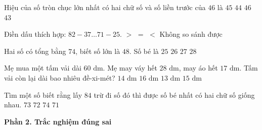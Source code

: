 \begin{ex} %
Hiệu của số tròn chục lớn nhất có hai chữ số và số liền trước của $46$ là
\choice
{\True $45$}
{$44$}
{$46$}
{$43$}
\end{ex}

\begin{ex} %
Điền dấu thích hợp: $82 - 37 \dots 71 - 25$.
\choice
{$>$}
{$=$}
{\True $<$}
{Không so sánh được}
\end{ex}

\begin{ex} %
Hai số có tổng bằng $74$, biết số lớn là $48$. Số bé là
\choice
{$25$}
{\True $26$}
{$27$}
{$28$}
\end{ex}

\begin{ex} %
Mẹ mua một tấm vải dài $60\text{ dm}$. Mẹ may váy hết $28\text{ dm}$, may áo hết $17\text{ dm}$. Tấm vải còn lại dài bao nhiêu đề-xi-mét?
\choice
{$14\text{ dm}$}
{$16\text{ dm}$}
{$13\text{ dm}$}
{\True $15\text{ dm}$}
\end{ex}

\begin{ex} %
Tìm một số biết rằng lấy $84$ trừ đi số đó thì được số bé nhất có hai chữ số giống nhau.
\choice
{\True $73$}
{$72$}
{$74$}
{$71$}
\end{ex}

\textbf{Phần 2. Trắc nghiệm đúng sai}

